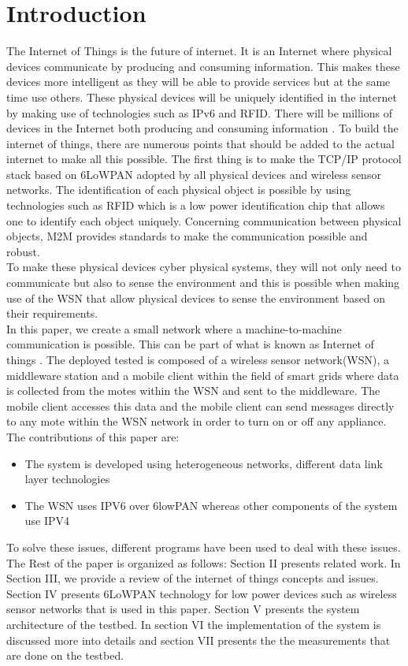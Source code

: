 \documentclass[conference]{IEEEtran}
\begin{document}
\section{Introduction}
The Internet of Things is the future of internet. It is an Internet where physical devices communicate by producing and consuming information. This makes these devices more intelligent as they will be able to provide services but at the same time use others. These physical devices will be uniquely identified in the internet by making use of technologies such as IPv6 and RFID. There will be millions of devices in the Internet both producing and consuming information \cite{ref8}. To build the internet of things, there are numerous points that should be added to the actual internet to make all this possible. The first thing is to make the TCP/IP protocol stack based on 6LoWPAN adopted by all physical devices and wireless sensor networks. The identification of each physical object is possible by using technologies such as RFID which is a low power identification chip that allows one to identify each object uniquely. Concerning communication between physical objects, M2M provides standards to make the communication possible and robust. 
\\
To make these physical devices cyber physical systems, they will not only need to communicate but also to sense the environment and this is possible when making use of the WSN that allow physical devices to sense the environment based on their requirements.
\\
In this paper, we create a small network where a machine-to-machine communication is possible. This can be part of what is known as Internet of things \cite{ref1}. The deployed tested  is composed of a wireless sensor network(WSN), a middleware station and a mobile client within the field of smart grids where data is collected from the motes within the WSN and sent to the middleware. The mobile client accesses this data and the mobile client can send messages directly to any mote within the WSN network in order to turn on or off any appliance. The contributions of this paper are:
\begin{itemize}
\item The system is developed using heterogeneous networks, different data link layer technologies
\item The WSN uses IPV6 over 6lowPAN whereas other components of the system use IPV4
\end{itemize}
To solve these issues, different programs have been used to deal with these issues.  \\
The Rest of the paper is organized as follows: Section II presents related work. In Section III, we provide a review of the internet of things concepts and issues. Section IV presents 6LoWPAN technology for low power devices such as wireless sensor networks that is used in this paper. Section V presents the system architecture of the testbed. In section VI the implementation of the system is discussed more into details and section VII presents the the measurements that are done on the testbed.
 
\end{document}

